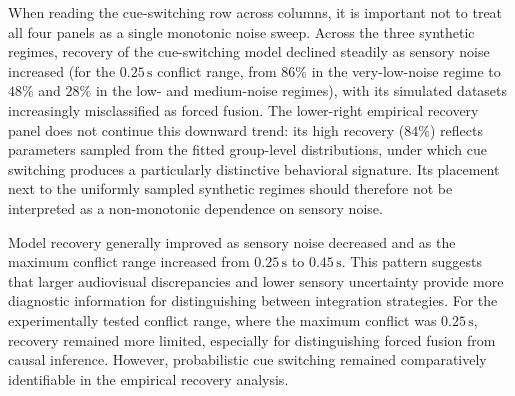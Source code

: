 \documentclass{biorxiv}
\begin{document}
When reading the cue-switching row across columns, it is important not to treat all four panels as a single monotonic noise sweep. Across the three synthetic regimes, recovery of the cue-switching model declined steadily as sensory noise increased (for the $0.25\,\mathrm{s}$ conflict range, from $86\%$ in the very-low-noise regime to $48\%$ and $28\%$ in the low- and medium-noise regimes), with its simulated datasets increasingly misclassified as forced fusion. The lower-right empirical recovery panel does not continue this downward trend: its high recovery ($84\%$) reflects parameters sampled from the fitted group-level distributions, under which cue switching produces a particularly distinctive behavioral signature. Its placement next to the uniformly sampled synthetic regimes should therefore not be interpreted as a non-monotonic dependence on sensory noise.


Model recovery generally improved as sensory noise decreased and as the maximum conflict range increased from $0.25\,\mathrm{s}$ to $0.45\,\mathrm{s}$. This pattern suggests that larger audiovisual discrepancies and lower sensory uncertainty provide more diagnostic information for distinguishing between integration strategies. For the experimentally tested conflict range, where the maximum conflict was $0.25\,\mathrm{s}$, recovery remained more limited, especially for distinguishing forced fusion from causal inference. However, probabilistic cue switching remained comparatively identifiable in the empirical recovery analysis.
\end{document}
